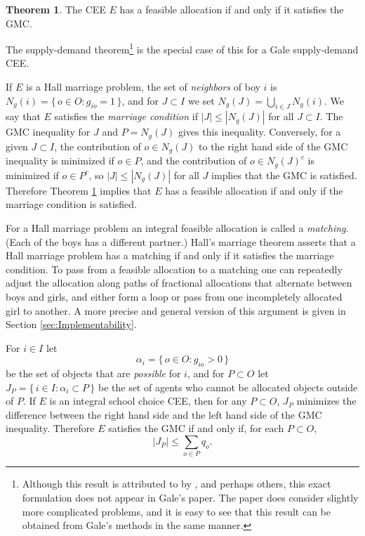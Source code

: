 \documentclass[12pt, A4paper]{article}
\theoremstyle{definition}
\newtheorem{thm}{Theorem}
\begin{document}
\begin{thm} \label{th:MultiHall}
  The CEE $E$ has a feasible allocation if and only if it satisfies the GMC.
\end{thm}

\noindent
The \cite{Gal57} supply-demand theorem\footnote{
Although this result is attributed to \cite{Gal57} by \cite{yilmaz10geb}, and perhaps others, this exact formulation does not appear in Gale's paper.  The paper does consider slightly more complicated problems, and it is easy to see that this result can be obtained from Gale's methods in the same manner.
} is the special case of this for a Gale supply-demand CEE.

If $E$ is a Hall marriage problem, the  set of \emph{neighbors} of boy $i$ is $N_g(i) = \{\, o \in O : g_{io} = 1
\,\}$, and for $J \subset I$ we set $N_g(J) = \bigcup_{i \in J}
N_g(i)$.  We say that $E$ satisfies the \emph{marriage condition} if $|J| \le |N_g(J)|$ for all $J \subset I$.  
The GMC inequality for $J$ and $P = N_g(J)$ gives this inequality.  Conversely, for a
given $J \subset I$, the contribution of $o \in N_g(J)$ to the right
hand side of the GMC inequality is minimized if $o \in P$, and the
contribution of $o \in N_g(J)^c$ is minimized if $o \in
P^c$, so $|J| \le |N_g(J)|$ for all $J$ implies that the GMC is
satisfied.  Therefore Theorem \ref{th:MultiHall} implies that $E$ has a feasible allocation if and only if the marriage condition is satisfied.

For a Hall marriage problem an integral feasible allocation is called a \emph{matching}.  (Each of the boys has a different partner.)  Hall's marriage theorem asserts that a Hall marriage problem has a matching if
and only if it satisfies the marriage condition.  
To pass from a feasible allocation to a matching one can repeatedly adjust the allocation along paths of fractional allocations that alternate between boys and girls, and either form a loop or pass from one incompletely allocated girl to another.  A more precise and general version of this argument is given in  Section \ref{sec:Implementability}.

For $i \in I$ let $$\alpha_i = \{\, o \in O : g_{io} > 0 \,\}$$ be the set of objects that are \emph{possible} for $i$, and for $P \subset O$ let
$J_P = \{\, i \in I : \alpha_i \subset P \,\}$ be the set of agents who cannot be allocated objects outside of $P$.
If $E$ is an integral school choice CEE, then for any $P \subset O$, $J_P$ minimizes the difference between the right hand side and the left hand side of the GMC inequality.  Therefore $E$ satisfies the GMC if and only if, for each $P \subset O$, $$|J_P| \le \sum_{o \in P} q_o.$$
\end{document}
